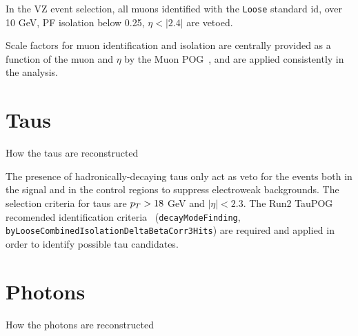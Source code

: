 
In the VZ event selection, all muons identified with the \texttt{Loose} standard id, \pt over 10 GeV, PF isolation below 0.25, $\eta<|2.4|$ are vetoed.

 
Scale factors for muon identification and isolation are centrally provided as a function of the muon \pt and $\eta$ by the Muon POG~\cite{MuonSF}, and are applied consistently in the analysis.


\section{Taus}\label{sec:tau}
{\color{red} How the taus are reconstructed}
 
The presence of hadronically-decaying taus only act as veto for the events both in the signal and in the control regions to suppress electroweak backgrounds. The selection criteria for taus are $p_T > 18$ GeV and $|\eta| < 2.3$. The Run2 TauPOG recomended identification criteria~\cite{TauPOG} (\texttt{decayModeFinding}, \texttt{byLooseCombinedIsolationDeltaBetaCorr3Hits})  are required and applied in order to identify possible tau candidates.
% 
\section{Photons}
{\color{red} How the photons are reconstructed}

